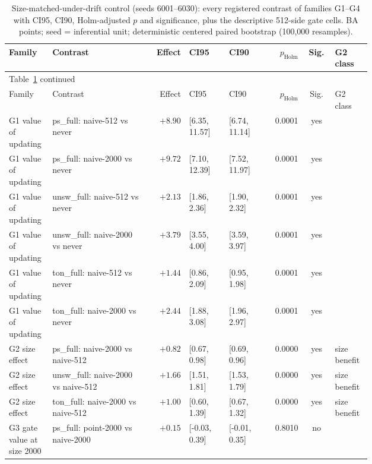 {\scriptsize
\setlength{\tabcolsep}{2pt}
\renewcommand{\arraystretch}{1.08}
\begin{longtable}{p{0.12\linewidth} p{0.27\linewidth} r p{0.11\linewidth} p{0.11\linewidth} r c p{0.10\linewidth}}
\caption{Size-matched-under-drift control (seeds 6001--6030): every registered contrast of
families G1--G4 with CI95, CI90, Holm-adjusted $p$ and significance, plus the descriptive
512-side gate cells. BA points; seed = inferential unit; deterministic centered paired
bootstrap (100{,}000 resamples).}\label{tab:size_matched_drift_supp}\\
\toprule
Family & Contrast & Effect & CI95 & CI90 & $p_{\mathrm{Holm}}$ & Sig. & G2 class \\
\midrule
\endfirsthead
\multicolumn{8}{l}{\small Table~\ref{tab:size_matched_drift_supp} continued}\\
\toprule
Family & Contrast & Effect & CI95 & CI90 & $p_{\mathrm{Holm}}$ & Sig. & G2 class \\
\midrule
\endhead
G1 value of updating & ps\_full: naive-512 vs never & $+8.90$ & [6.35, 11.57] & [6.74, 11.14] & 0.0001 & yes &  \\
G1 value of updating & ps\_full: naive-2000 vs never & $+9.72$ & [7.10, 12.39] & [7.52, 11.97] & 0.0001 & yes &  \\
G1 value of updating & unsw\_full: naive-512 vs never & $+2.13$ & [1.86, 2.36] & [1.90, 2.32] & 0.0001 & yes &  \\
G1 value of updating & unsw\_full: naive-2000 vs never & $+3.79$ & [3.55, 4.00] & [3.59, 3.97] & 0.0001 & yes &  \\
G1 value of updating & ton\_full: naive-512 vs never & $+1.44$ & [0.86, 2.09] & [0.95, 1.98] & 0.0001 & yes &  \\
G1 value of updating & ton\_full: naive-2000 vs never & $+2.44$ & [1.88, 3.08] & [1.96, 2.97] & 0.0001 & yes &  \\
G2 size effect & ps\_full: naive-2000 vs naive-512 & $+0.82$ & [0.67, 0.98] & [0.69, 0.96] & 0.0000 & yes & size benefit \\
G2 size effect & unsw\_full: naive-2000 vs naive-512 & $+1.66$ & [1.51, 1.81] & [1.53, 1.79] & 0.0000 & yes & size benefit \\
G2 size effect & ton\_full: naive-2000 vs naive-512 & $+1.00$ & [0.60, 1.39] & [0.67, 1.32] & 0.0000 & yes & size benefit \\
G3 gate value at size 2000 & ps\_full: point-2000 vs naive-2000 & $+0.15$ & [-0.03, 0.39] & [-0.01, 0.35] & 0.8010 & no &  \\

\end{longtable}}
